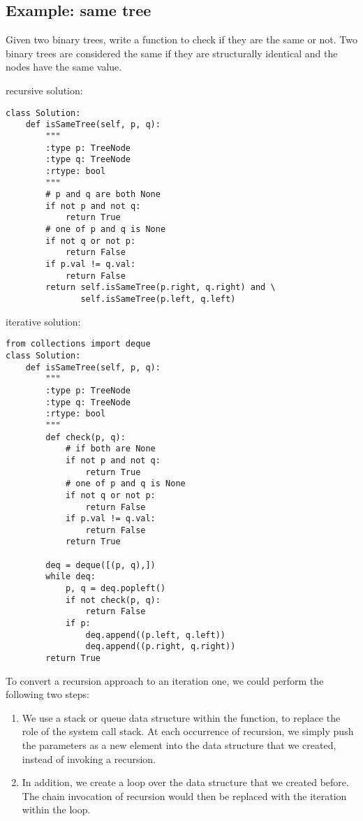 \subsection{Example: same tree}

Given two binary trees, write a function to check if they are the same or not.
Two binary trees are considered the same if they are structurally identical and the nodes have the same value.


recursive solution:
\begin{lstlisting}
class Solution:
    def isSameTree(self, p, q):
        """
        :type p: TreeNode
        :type q: TreeNode
        :rtype: bool
        """    
        # p and q are both None
        if not p and not q:
            return True
        # one of p and q is None
        if not q or not p:
            return False
        if p.val != q.val:
            return False
        return self.isSameTree(p.right, q.right) and \
               self.isSameTree(p.left, q.left)  
\end{lstlisting}

iterative solution:
\begin{lstlisting}
from collections import deque
class Solution:
    def isSameTree(self, p, q):
        """
        :type p: TreeNode
        :type q: TreeNode
        :rtype: bool
        """    
        def check(p, q):
            # if both are None
            if not p and not q:
                return True
            # one of p and q is None
            if not q or not p:
                return False
            if p.val != q.val:
                return False
            return True
        
        deq = deque([(p, q),])
        while deq:
            p, q = deq.popleft()
            if not check(p, q):
                return False         
            if p:
                deq.append((p.left, q.left))
                deq.append((p.right, q.right))
        return True  
\end{lstlisting}


To convert a recursion approach to an iteration one, we could perform the following two steps:
\begin{enumerate}
\item We use a stack or queue data structure within the function, to replace the role of the system call stack. At each occurrence of recursion, we simply push the parameters as a new element into the data structure that we created, instead of invoking a recursion.
\item In addition, we create a loop over the data structure that we created before. The chain invocation of recursion would then be replaced with the iteration within the loop.
\end{enumerate}



